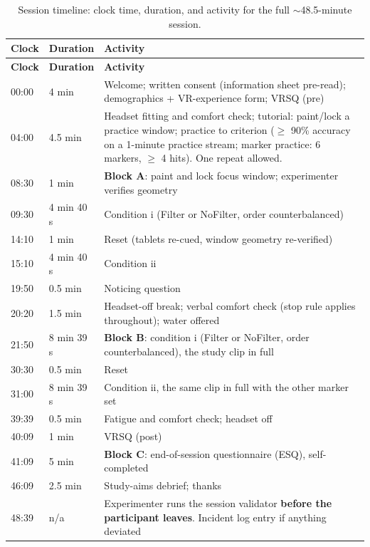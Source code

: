 \begin{longtable}{p{}|p{}|p{}}
\caption{Session timeline: clock time, duration, and activity for the full $\sim$48.5-minute session.}\\
\hline
\textbf{Clock} & \textbf{Duration} & \textbf{Activity} \\
\hline
\endfirsthead
\hline
\textbf{Clock} & \textbf{Duration} & \textbf{Activity} \\
\hline
\endhead
\hline
00:00 & 4 min & Welcome; written consent (information sheet pre-read); demographics + VR-experience form; VRSQ (pre) \\
04:00 & 4.5 min & Headset fitting and comfort check; tutorial: paint/lock a practice window; practice to criterion ($\geq$ 90\% accuracy on a 1-minute practice stream; marker practice: 6 markers, $\geq$ 4 hits). One repeat allowed. \\
08:30 & 1 min & \textbf{Block A}: paint and lock focus window; experimenter verifies geometry \\
09:30 & 4 min 40 s & Condition i (Filter or NoFilter, order counterbalanced) \\
14:10 & 1 min & Reset (tablets re-cued, window geometry re-verified) \\
15:10 & 4 min 40 s & Condition ii \\
19:50 & 0.5 min & Noticing question \\
20:20 & 1.5 min & Headset-off break; verbal comfort check (stop rule applies throughout); water offered \\
21:50 & 8 min 39 s & \textbf{Block B}: condition i (Filter or NoFilter, order counterbalanced), the study clip in full \\
30:30 & 0.5 min & Reset \\
31:00 & 8 min 39 s & Condition ii, the same clip in full with the other marker set \\
39:39 & 0.5 min & Fatigue and comfort check; headset off \\
40:09 & 1 min & VRSQ (post) \\
41:09 & 5 min & \textbf{Block C}: end-of-session questionnaire (ESQ), self-completed \\
46:09 & 2.5 min & Study-aims debrief; thanks \\
48:39 & n/a & Experimenter runs the session validator \textbf{before the participant leaves}. Incident log entry if anything deviated \\
\hline
\end{longtable}

